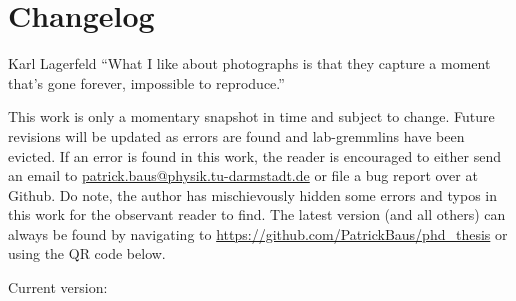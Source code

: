 \chapter{Changelog}
\begin{chapquote}{Karl Lagerfeld}
``What I like about photographs is that they capture a moment that’s gone forever, impossible to reproduce.''
\end{chapquote}

This work is only a momentary snapshot in time and subject to change. Future revisions will be updated as errors are found and lab-gremmlins have been evicted. If an error is found in this work, the reader is encouraged to either send an email to \url{patrick.baus@physik.tu-darmstadt.de} or file a bug report over at Github. Do note, the author has mischievously hidden some errors and typos in this work for the observant reader to find. The latest version (and all others) can always be found by navigating to \url{https://github.com/PatrickBaus/phd_thesis} or using the QR code below.
\begin{center}
\end{center}

\begin{center}
    \begin{minipage}{0.8\linewidth}
        \centering
        Current version: \versionNumber
    \end{minipage}%
\end{center}

